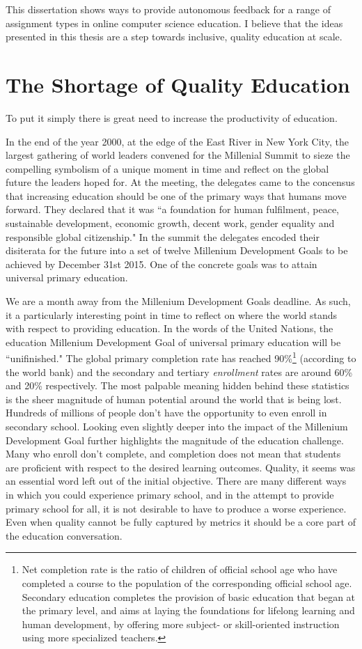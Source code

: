 This dissertation shows ways to provide autonomous feedback for a range of assignment types in online computer science education. I believe that the ideas presented in this thesis are a step towards inclusive, quality education at scale.

\section{The Shortage of Quality Education}

To put it simply there is great need to increase the productivity of education.

In the end of the year 2000, at the edge of the East River in New York City, the largest gathering of world leaders convened for the Millenial Summit to sieze the compelling symbolism of a unique moment in time and reflect on the  global future the leaders hoped for. At the meeting, the delegates came to the concensus that increasing education should be one of the primary ways that humans move forward. They declared that it was ``a foundation for human fulfilment, peace, sustainable development, economic
growth, decent work, gender equality and responsible global citizenship." In the summit the delegates encoded their disiterata for the future into a set of twelve Millenium Development Goals to be achieved by December 31st 2015. One of the concrete goals was to attain universal primary education. 

We are a month away from the Millenium Development Goals deadline. As such, it a particularly interesting point in time to reflect on where the world stands with respect to providing education. In the words of the United Nations, the education Millenium Development Goal of universal primary education will be ``unifinished." The global primary completion rate has reached 90\%\footnote{Net completion rate is the ratio of children of official school age who have completed a course to the population of the corresponding official school age. Secondary education completes the provision of basic education that began at the primary level, and aims at laying the foundations for lifelong learning and human development, by offering more subject- or skill-oriented instruction using more specialized teachers.} (according to the world bank) and the secondary and tertiary \emph{enrollment} rates are around 60\% and 20\% respectively. The most palpable meaning hidden behind these statistics is the sheer magnitude of human potential around the world that is being lost. Hundreds of millions of people don't have the opportunity to even enroll in secondary school. Looking even slightly deeper into the impact of the Millenium Development Goal further highlights the magnitude of the education challenge. Many who enroll don't complete, and completion does not mean that students are proficient with respect to the desired learning outcomes. Quality, it seems was an essential word left out of the initial objective. There are many different ways in which you could experience primary school, and in the attempt to provide primary school for all, it is not desirable to have to produce a worse experience. Even when quality cannot be fully captured by metrics it should be a core part of the education conversation.

